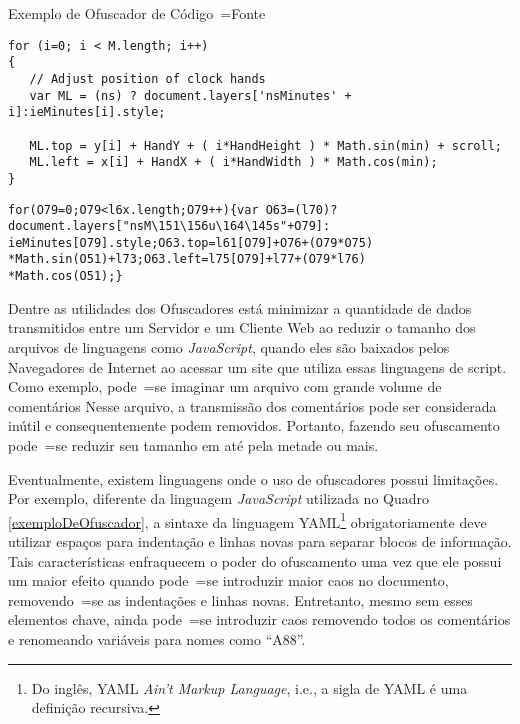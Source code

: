\begin{quadro}[h]
\caption{Exemplo de Ofuscador de Código~=Fonte \cite{familyOfSourceCodeObfuscators}}
\label{exemploDeOfuscador}
\begin{bluebox}
\lstset{xleftmargin=2em,aboveskip=0pt}

\begin{lstlisting}[caption={Antes do ofuscamento}]
for (i=0; i < M.length; i++)
{
   // Adjust position of clock hands
   var ML = (ns) ? document.layers['nsMinutes' + i]:ieMinutes[i].style;

   ML.top = y[i] + HandY + ( i*HandHeight ) * Math.sin(min) + scroll;
   ML.left = x[i] + HandX + ( i*HandWidth ) * Math.cos(min);
}
\end{lstlisting}

\begin{lstlisting}[caption={Depois do ofuscamento}]
for(O79=0;O79<l6x.length;O79++){var O63=(l70)?
document.layers["nsM\151\156u\164\145s"+O79]:
ieMinutes[O79].style;O63.top=l61[O79]+O76+(O79*O75)
*Math.sin(O51)+l73;O63.left=l75[O79]+l77+(O79*l76)
*Math.cos(O51);}
\end{lstlisting}
\end{bluebox}
\end{quadro}

Dentre as utilidades dos Ofuscadores está minimizar a quantidade de dados transmitidos entre um Servidor e
um Cliente Web ao reduzir o tamanho dos arquivos de linguagens como \textit{JavaScript},
quando eles são baixados pelos Navegadores de Internet ao acessar um site que utiliza essas linguagens de script.
Como exemplo,
pode~=se imaginar um arquivo com grande volume de comentários Nesse arquivo,
a transmissão dos comentários pode ser considerada inútil e
consequentemente podem removidos.
Portanto,
fazendo seu ofuscamento pode~=se reduzir seu tamanho em até pela metade ou
mais.

Eventualmente,
existem linguagens onde o uso de ofuscadores possui limitações.
Por exemplo,
diferente da linguagem \textit{JavaScript} utilizada no Quadro \ref{exemploDeOfuscador},
a sintaxe da linguagem YAML\footnote{
Do inglês,
YAML \textit{Ain't Markup Language},
i.e.,
a sigla de YAML é uma definição recursiva.
}
\cite{yamlSpecificModelChecking} obrigatoriamente deve utilizar espaços para indentação e
linhas novas para separar blocos de informação.
Tais características enfraquecem o poder do ofuscamento uma vez que ele possui um maior efeito quando pode~=se introduzir maior caos no documento,
removendo~=se as indentações e
linhas novas. Entretanto,
mesmo sem esses elementos chave,
ainda pode~=se introduzir caos removendo todos os comentários e
renomeando variáveis para nomes  como ``A88''.


